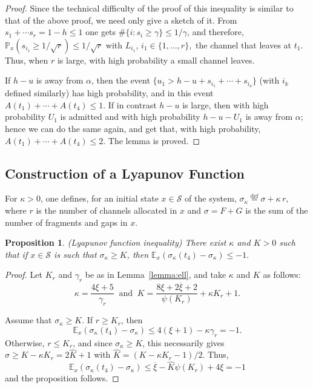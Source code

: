 \documentclass{amsart}
\def\E{\mathbb{E}}
\def\P{\mathbb{P}}
\def\Scal{\mathcal{S}}
\newtheorem{proposition}{Proposition}
\begin{document}
\begin{proof}
Since the technical difficulty of the proof of this inequality is
similar to that of the above proof, we need only give a sketch of
it. From $s_1 + \cdots s_r = 1-h \leq 1$ one gets $\# \{ i : s_i
\geq \gamma \} \leq 1 / \gamma$, and therefore, $\P_x(s_{i_1} \geq
1/\sqrt r) \leq 1/\sqrt r$ with $L_{i_1}$, $i_1 \in \{1, \ldots,
r\},$ the channel that leaves at $t_1$. Thus, when $r$ is large,
with high probability a small channel leaves.


If $h-u$ is away from $\alpha$, then the event $\{u_1 > h - u + s_{i_1} + \cdots + s_{i_4}
\}$  (with $i_k$ defined  similarly) has  high probability,  and in  this event  $A(t_1) +
\cdots + A(t_4) \leq  1$. If in contrast $h-u$ is large,  then with high probability $U_1$
is admitted and with high probability $h - u - U_1$ is away from $\alpha$; hence we can do
the  same again,  and get  that, with  high probability,  $A(t_1) +  \cdots +  A(t_4) \leq
2$. The lemma is proved.
\end{proof}

\subsection*{Construction of a Lyapunov Function}
For $\kappa
> 0$, one defines, for an initial state $x\in\Scal$ of the system,
$\sigma_\kappa \stackrel{\text{def}}{=} \sigma+ \kappa \, r,$ where
$r$  is the number of channels allocated in $x$ and $\sigma=F+G$ is
the sum of the number of fragments and gaps in $x$.
\begin{proposition} {\em (Lyapunov function inequality)} \label{prop:lyapunov}
There exist $\kappa$ and $K > 0$ such that if $x \in \Scal$ is such
that $\sigma_\kappa \geq K$, then
$ \E_x(\sigma_\kappa(t_4) - \sigma_\kappa) \leq - 1.$
\end{proposition}
\begin{proof}
   Let $K_r$ and $\gamma_r$ be as in Lemma~\ref{lemma:ell}, and take
    $\kappa$ and $K$ as follows:
\[ \kappa = \frac{4 \xi + 5}{\gamma_r}\ \text{ and }\ K =
\frac{8 \xi + 2\overline{\xi} + 2}{\psi(K_r)} + \kappa K_r + 1.
\]

Assume that $\sigma_\kappa \geq K$. If $r \geq K_r$, then
    \[ \E_x(\sigma_\kappa(t_4) - \sigma_\kappa)\leq 4(\xi + 1) - \kappa \gamma_r = -1. \]
Otherwise, $r \leq K_r$, and since $\sigma_\kappa \geq K$, this
necessarily gives $\sigma \geq K - \kappa K_r = 2\hat{K}+1$ with
$\hat{K} = (K - \kappa K_r - 1) / 2$. Thus,
    \[ \E_x(\sigma_\kappa(t_4) - \sigma_\kappa) \leq \overline{\xi} -
    \hat{K} \psi(K_r) + 4 \xi = -1 \]
and the proposition follows.
\end{proof}
\end{document}
